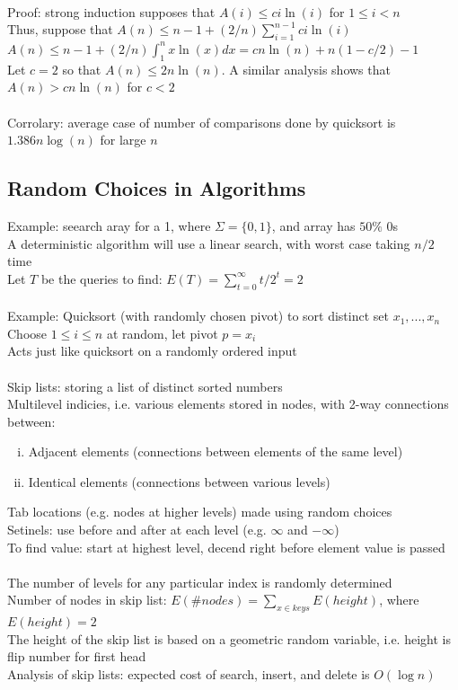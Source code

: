 \documentclass{article}
\begin{document}
			\\
			Proof: strong induction supposes that $A(i) \leq ci\ln(i)$ for $1 \leq i < n$ \\
			Thus, suppose that $A(n) \leq n - 1 + (2/n)\sum_{i = 1}^{n - 1} ci \ln(i)$ \\
			$A(n) \leq n - 1 + (2/n)\int_1^n x \ln(x) dx = cn\ln(n) + n(1 - c/2) - 1$ \\
			Let $c = 2$ so that $A(n) \leq 2 n\ln(n)$. A similar analysis shows that $A(n) > cn\ln(n)$ for $c < 2$ \\
			\\
			Corrolary: average case of number of comparisons done by quicksort is $1.386n\log(n)$ for large $n$
		\subsection{Random Choices in Algorithms}
			Example: seearch aray for a 1, where $\Sigma = \{0, 1\}$, and array has $50\%$ 0s \\
			A deterministic algorithm will use a linear search, with worst case taking $n/2$ time \\
			Let $T$ be the queries to find: $E(T) = \sum_{t = 0}^\infty t/2^t = 2$ \\
			\\
			Example: Quicksort (with randomly chosen pivot) to sort distinct set $x_1, ..., x_n$ \\
			Choose $1 \leq i \leq n$ at random, let pivot $p = x_i$ \\
			Acts just like quicksort on a randomly ordered input \\
			\\
			Skip lists: storing a list of distinct sorted numbers \\
			Multilevel indicies, i.e. various elements stored in nodes, with 2-way connections between:
			\begin{enumerate}[(i)]
				\item Adjacent elements (connections between elements of the same level)
				\item Identical elements (connections between various levels)
				\end{enumerate}
			Tab locations (e.g. nodes at higher levels) made using random choices \\
			Setinels: use before and after at each level (e.g. $\infty$ and $-\infty$) \\
			To find value: start at highest level, decend right before element value is passed \\
			\\
			The number of levels for any particular index is randomly determined \\
			Number of nodes in skip list: $E(\#nodes) = \sum_{x \in keys}E(height)$, where $E(height) = 2$ \\
			The height of the skip list is based on a geometric random variable, i.e. height is flip number for first head \\
			Analysis of skip lists: expected cost of search, insert, and delete is $O(\log{n})$
\end{document}

